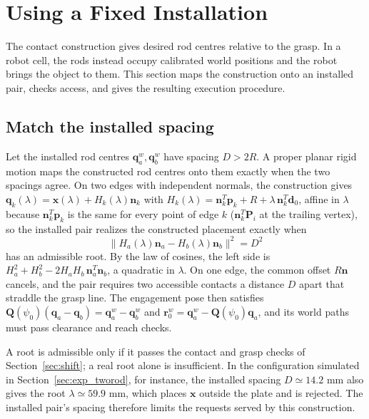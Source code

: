 \section{Using a Fixed Installation}
\label{sec:installation}

The contact construction gives desired rod centres relative to the grasp. In a robot cell, the rods instead occupy calibrated world positions and the robot brings the object to them. This section maps the construction onto an installed pair, checks access, and gives the resulting execution procedure.

\subsection{Match the installed spacing}
\label{sec:spacing}

Let the installed rod centres $\mathbf q_a^w,\mathbf q_b^w$ have spacing $D>2R$. A proper planar rigid motion maps the constructed rod centres onto them exactly when the two spacings agree. On two edges with independent normals, the construction gives $\mathbf q_k(\lambda)=\mathbf x(\lambda)+H_k(\lambda)\mathbf n_k$ with $H_k(\lambda)=\mathbf n_k^T\mathbf p_k+R+\lambda\,\mathbf n_k^T\hat{\mathbf d}_0$, affine in $\lambda$ because $\mathbf n_k^T\mathbf p_k$ is the same for every point of edge $k$ ($\mathbf n_k^T\mathbf P_i$ at the trailing vertex), so the installed pair realizes the constructed placement exactly when
\begin{equation}
  \bigl\|H_a(\lambda)\mathbf n_a-H_b(\lambda)\mathbf n_b\bigr\|^2=D^2
  \label{eq:spacing}
\end{equation}
has an admissible root. By the law of cosines, the left side is $H_a^2+H_b^2-2H_aH_b\,\mathbf n_a^T\mathbf n_b$, a quadratic in $\lambda$. On one edge, the common offset $R\mathbf n$ cancels, and the pair requires two accessible contacts a distance $D$ apart that straddle the grasp line. The engagement pose then satisfies $\mathbf Q(\psi_0)(\mathbf q_a-\mathbf q_b)=\mathbf q_a^w-\mathbf q_b^w$ and $\mathbf r^w_0=\mathbf q_a^w-\mathbf Q(\psi_0)\mathbf q_a$, and its world paths must pass clearance and reach checks.

A root is admissible only if it passes the contact and grasp checks of Section~\ref{sec:shift}; a real root alone is insufficient. In the configuration simulated in Section~\ref{sec:exp_tworod}, for instance, the installed spacing $D\simeq14.2$ mm also gives the root $\lambda\simeq59.9$ mm, which places $\mathbf x$ outside the plate and is rejected. The installed pair's spacing therefore limits the requests served by this construction.

